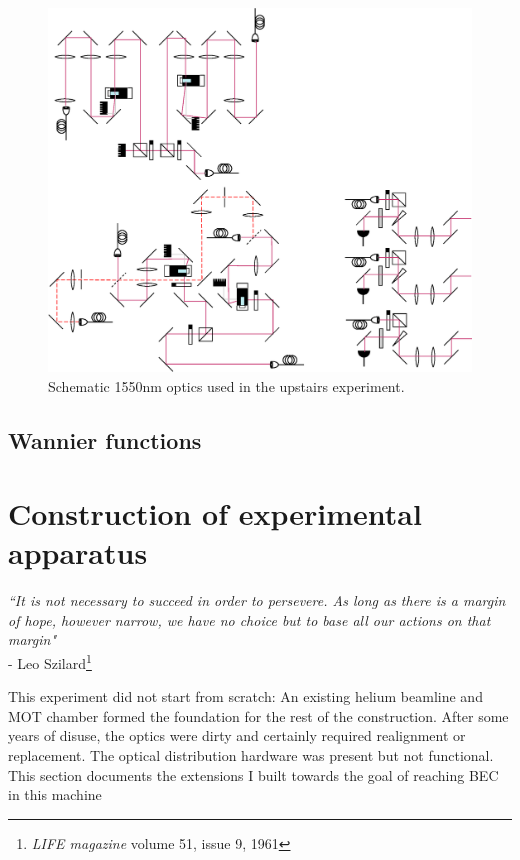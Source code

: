 	\begin{figure}[h]
	\centering
	\includegraphics[width=\textwidth]{fig/apparatus/dipole_optics}
	\caption{Schematic 1550nm optics used in the upstairs experiment.}
	\label{fig:dipole_optics}
	\end{figure}

\subsection{Wannier functions}


\section{Construction of experimental apparatus}

\begin{adjustwidth}{1cm}{0cm}
\begin{flushright}
\emph{``It is not necessary to succeed in order to persevere.
	As long as there is a margin of hope, however narrow, we have no choice but to base all our actions on that margin"}\\
- Leo Szilard\footnote{\emph{LIFE magazine} volume 51, issue 9, 1961 }\\
\end{flushright}
\end{adjustwidth}

This experiment did not start from scratch: An existing helium beamline and MOT chamber formed the foundation for the rest of the construction.
	After some years of disuse, the optics were dirty and certainly required realignment or replacement.
	The optical distribution hardware was present but not functional.
	This section documents the extensions I built towards the goal of reaching BEC in this machine

